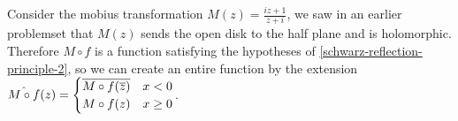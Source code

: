 \documentclass{homework}
\begin{document}
                                                                                                                                                                                                                                                                                                                                \begin{solution}
                                                                                                                                                                                                                                                                                                                                Consider the mobius transformation $M(z) = \frac{iz+1}{z + i}$, we saw in an earlier problemset that $M(z)$ sends the open disk to the half plane and is holomorphic. %
                                                                                                                                                                                                                                                                                                                                Therefore $M\circ f$ is a function satisfying the hypotheses of \ref{schwarz-reflection-principle-2}, so we can create an entire function by the extension $\hat{M\circ f}(z) = 
                                                                                                                                                                                                                                                                                                                                \begin{cases}
                                                                                                                                                                                                                                                                                                                                    \overline{M\circ f(\overline{z})} & x < 0\\
                                                                                                                                                                                                                                                                                                                                        M\circ f(z)&x\geq 0
                                                                                                                                                                                                                                                                                                                                        \end{cases}$. 

\end{solution}
\end{document}
